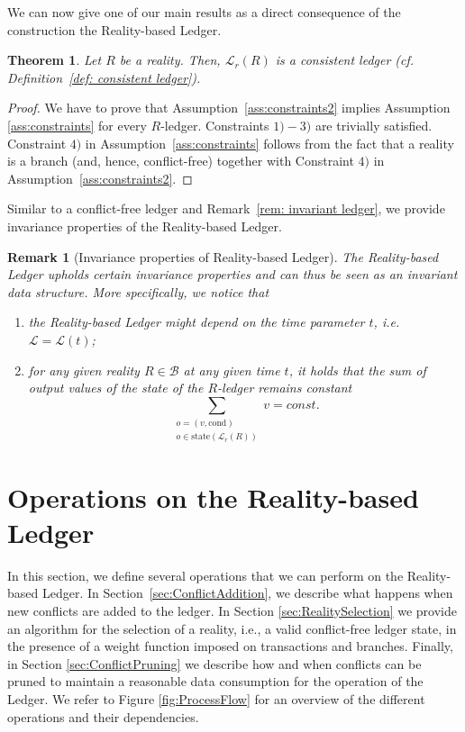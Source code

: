 \documentclass[11pt]{article}
\newcommand{\weight}{v}
\newcommand{\cond}{\mathrm{cond}}
\newcommand{\state}{\mathrm{state}}
\newcommand{\branchset}{\mathcal{B}}
\newcommand{\ledger}{\mathcal{L}}
\theoremstyle{plain}
\newtheorem{theorem}{Theorem}
\newtheorem{remark}{Remark}
\theoremstyle{definition}
\numberwithin{definition}{section}
\numberwithin{lemma}{section}
\numberwithin{ass}{section}
\numberwithin{remark}{section}
\numberwithin{example}{section}
\numberwithin{proposition}{section}
\numberwithin{theorem}{section}
\begin{document}
We can now give one of our main results as a direct consequence of the construction the Reality-based Ledger. 
\begin{theorem}\label{thm:Rledger}
Let $R$ be a reality. Then, $\ledger_r(R)$ is a consistent ledger (cf. Definition~\ref{def: consistent ledger}).
\end{theorem}
\begin{proof}
We have to prove that Assumption~\ref{ass:constraints2} implies Assumption \ref{ass:constraints} for every $R$-ledger. Constraints $1)-3)$ are trivially satisfied. Constraint $4)$ in Assumption~\ref{ass:constraints}  follows from the fact that a reality is a branch (and, hence, conflict-free) together with Constraint $4)$ in Assumption~\ref{ass:constraints2}.
\end{proof}

Similar to  a conflict-free ledger and Remark~\ref{rem: invariant ledger}, we provide invariance properties of the Reality-based Ledger.
\begin{remark}[Invariance properties of Reality-based Ledger]\label{rem: invariance reality}
The Reality-based Ledger upholds certain invariance properties and can thus be seen as an invariant data structure. More specifically, we notice that 
\begin{enumerate}[leftmargin=*] 
\item the Reality-based Ledger  might depend on the time parameter $t$, i.e. $\ledger=\ledger(t)$;
\item for any given reality $R\in\branchset$ at any given time $t$, it holds that the sum of output values of the state of the $R$-ledger remains constant
$$
\sum_{\substack{o=(\weight,\cond)\\o\in \state(\ledger_r(R))}} \weight = const.
$$
\end{enumerate}
\end{remark}

\section{Operations on the Reality-based Ledger}\label{sec: operations on the ledger}
In this section, we define several operations that we can perform on the Reality-based Ledger. In Section~\ref{sec:ConflictAddition}, we describe what happens when new conflicts are added to the ledger. In Section \ref{sec:RealitySelection} we provide an algorithm for the selection of a reality, i.e., a valid conflict-free ledger state, in the presence of a weight function imposed on transactions and branches. Finally, in Section \ref{sec:ConflictPruning} we describe how and when conflicts can be pruned to maintain a reasonable data  consumption for the operation of the Ledger. We refer to Figure \ref{fig:ProcessFlow} for an overview of the different operations and their dependencies.
\end{document}
